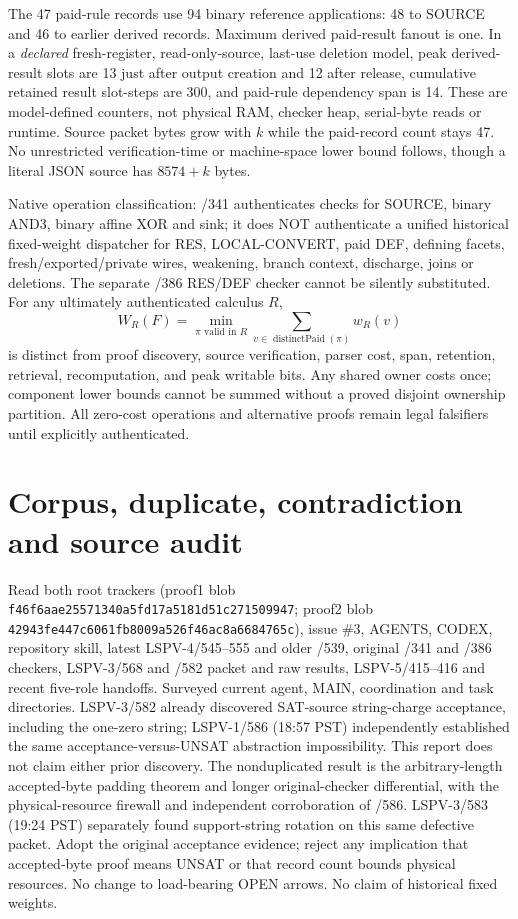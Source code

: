 \documentclass[11pt]{article}
\begin{document}
The 47 paid-rule records use 94 binary reference applications: 48 to SOURCE and 46 to earlier derived records. Maximum derived paid-result fanout is one. In a \emph{declared} fresh-register, read-only-source, last-use deletion model, peak derived-result slots are 13 just after output creation and 12 after release, cumulative retained result slot-steps are 300, and paid-rule dependency span is 14. These are model-defined counters, not physical RAM, checker heap, serial-byte reads or runtime. Source packet bytes grow with $k$ while the paid-record count stays 47. No unrestricted verification-time or machine-space lower bound follows, though a literal JSON source has $8574+k$ bytes.

Native operation classification: /341 authenticates checks for SOURCE, binary AND3, binary affine XOR and sink; it does NOT authenticate a unified historical fixed-weight dispatcher for RES, LOCAL-CONVERT, paid DEF, defining facets, fresh/exported/private wires, weakening, branch context, discharge, joins or deletions. The separate /386 RES/DEF checker cannot be silently substituted. For any ultimately authenticated calculus $R$,
\[
 W_R(F)=\min_{\pi\text{ valid in }R}\sum_{v\in\operatorname{distinctPaid}(\pi)}w_R(v)
\]
is distinct from proof discovery, source verification, parser cost, span, retention, retrieval, recomputation, and peak writable bits. Any shared owner costs once; component lower bounds cannot be summed without a proved disjoint ownership partition. All zero-cost operations and alternative proofs remain legal falsifiers until explicitly authenticated.

\section*{Corpus, duplicate, contradiction and source audit}
Read both root trackers (proof1 blob \texttt{f46f6aae25571340a5fd17a5181d51c271509947}; proof2 blob \texttt{42943fe447c6061fb8009a526f46ac8a6684765c}), issue \#3, AGENTS, CODEX, repository skill, latest LSPV-4/545--555 and older /539, original /341 and /386 checkers, LSPV-3/568 and /582 packet and raw results, LSPV-5/415--416 and recent five-role handoffs. Surveyed current agent, MAIN, coordination and task directories. LSPV-3/582 already discovered SAT-source string-charge acceptance, including the one-zero string; LSPV-1/586 (18:57 PST) independently established the same acceptance-versus-UNSAT abstraction impossibility. This report does not claim either prior discovery. The nonduplicated result is the arbitrary-length accepted-byte padding theorem and longer original-checker differential, with the physical-resource firewall and independent corroboration of /586. LSPV-3/583 (19:24 PST) separately found support-string rotation on this same defective packet. Adopt the original acceptance evidence; reject any implication that accepted-byte proof means UNSAT or that record count bounds physical resources. No change to load-bearing OPEN arrows. No claim of historical fixed weights.
\end{document}
